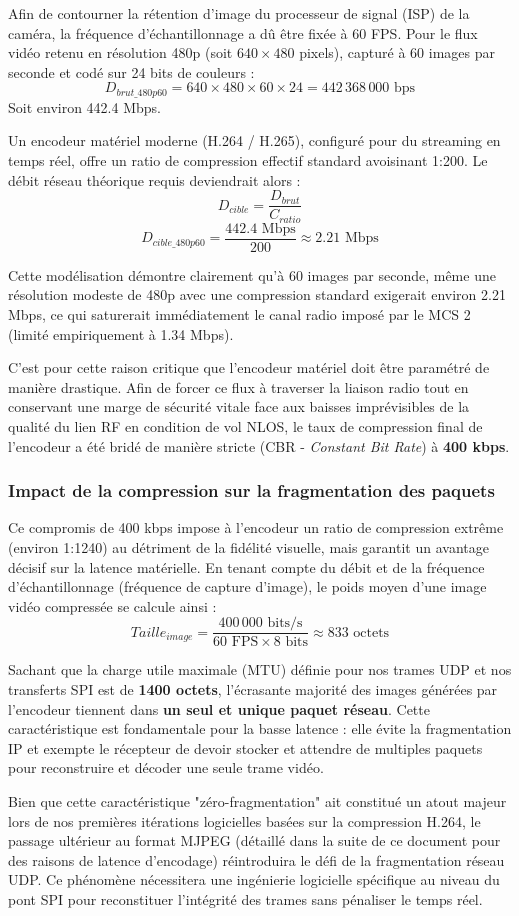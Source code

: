 Afin de contourner la rétention d'image du processeur de signal (ISP) de la caméra, la fréquence 
d'échantillonnage a dû être fixée à 60 FPS. Pour le flux vidéo retenu en résolution 480p 
(soit $640 \times 480$ pixels), capturé à 60 images par seconde et codé sur 24 bits de couleurs :
$$D_{brut\_480p60} = 640 \times 480 \times 60 \times 24 = 442\,368\,000 \text{ bps}$$
Soit environ 442.4 Mbps.

Un encodeur matériel moderne (H.264 / H.265), configuré pour du streaming en temps réel, offre un ratio de 
compression effectif standard avoisinant 1:200. Le débit réseau théorique requis deviendrait alors :
$$D_{cible} = \frac{D_{brut}}{C_{ratio}}$$
$$D_{cible\_480p60} = \frac{442.4 \text{ Mbps}}{200} \approx 2.21 \text{ Mbps}$$

Cette modélisation démontre clairement qu'à 60 images par seconde, même une résolution modeste de 480p avec 
une compression standard exigerait environ 2.21 Mbps, ce qui saturerait immédiatement le canal radio imposé 
par le MCS 2 (limité empiriquement à 1.34 Mbps).

C'est pour cette raison critique que l'encodeur matériel doit être paramétré de manière drastique. Afin de 
forcer ce flux à traverser la liaison radio tout en conservant une marge de sécurité vitale face aux baisses 
imprévisibles de la qualité du lien RF en condition de vol NLOS, le taux de compression final de l'encodeur 
a été bridé de manière stricte (CBR - \textit{Constant Bit Rate}) à \textbf{400 kbps}. 

\subsubsection{Impact de la compression sur la fragmentation des paquets}
Ce compromis de 400 kbps impose à l'encodeur un ratio de compression extrême (environ 1:1240) au détriment 
de la fidélité visuelle, mais garantit un avantage décisif sur la latence matérielle. En tenant compte du débit 
et de la fréquence d'échantillonnage (fréquence de capture d'image), le poids moyen d'une image vidéo compressée se calcule ainsi :
$$Taille_{image} = \frac{400\,000 \text{ bits/s}}{60 \text{ FPS} \times 8 \text{ bits}} \approx 833 \text{ octets}$$

Sachant que la charge utile maximale (MTU) définie pour nos trames UDP et nos transferts SPI est de 
\textbf{1400 octets}, l'écrasante majorité des images générées par l'encodeur tiennent dans 
\textbf{un seul et unique paquet réseau}. Cette caractéristique est fondamentale pour la basse latence : 
elle évite la fragmentation IP et exempte le récepteur de devoir stocker et attendre de multiples paquets 
pour reconstruire et décoder une seule trame vidéo.

Bien que cette caractéristique "zéro-fragmentation" ait constitué un atout majeur lors de nos premières 
itérations logicielles basées sur la compression H.264, le passage ultérieur au format MJPEG 
(détaillé dans la suite de ce document pour des raisons de latence d'encodage) réintroduira le défi 
de la fragmentation réseau UDP. Ce phénomène nécessitera une ingénierie logicielle spécifique au niveau 
du pont SPI pour reconstituer l'intégrité des trames sans pénaliser le temps réel.